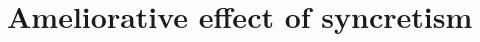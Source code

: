 \documentclass[output=paper]{langscibook}
\begin{document}









\section{Ameliorative effect of \sti syncretism}
\end{document}

